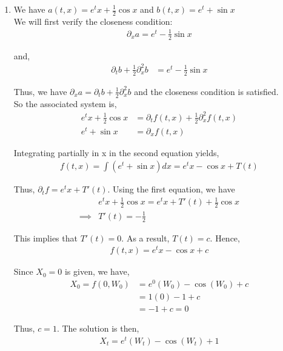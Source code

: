 \documentclass[12pt]{article}
\begin{document}
\begin{enumerate}[\alph*)]
\item We have $a(t,x) = e^tx + \frac{1}{2}\cos x$ and $b(t,x) = e^t + \sin x$\\

We will first verify the closeness condition:
\begin{align*}
\partial_x a = e^t - \frac{1}{2}\sin x
\end{align*}

and,
\begin{align*}
\partial_t b + \frac{1}{2} \partial_x^2 b &= e^t - \frac{1}{2}\sin x
\end{align*}

Thus, we have $\partial_x a = \partial_t b + \frac{1}{2} \partial_x^2 b$ and the closeness condition is satisfied.\\

So the associated system is,
\begin{align*}
e^tx + \frac{1}{2}\cos x &= \partial_t f(t,x) + \frac{1}{2} \partial_x^2 f(t,x)\\
e^t + \sin x &= \partial_x f(t,x)
\end{align*}

Integrating partially in x in the second equation yields,
\begin{align*}
f(t,x) = \int (e^t + \sin x) dx = e^tx - \cos x + T(t)
\end{align*}

Thus, $\partial_t f = e^tx + T'(t)$. Using the first equation, we have
\begin{align*}
&e^tx + \frac{1}{2}\cos x = e^tx + T'(t) + \frac{1}{2}\cos x\\
\implies &T'(t) = -\frac{1}{2}
\end{align*}

This implies that $T'(t) = 0$. As a result, $T(t) = c$. Hence,
\begin{align*}
f(t,x) = e^tx - \cos x + c
\end{align*}

Since $X_0 = 0$ is given, we have,
\begin{align*}
X_0 = f(0, W_0) &= e^0(W_0) - \cos(W_0) + c\\
&= 1(0) - 1 + c\\
&= -1 + c = 0
\end{align*}

Thus, $c = 1$. The solution is then,
\begin{align*}
X_t = e^t(W_t) - \cos(W_t) + 1
\end{align*} 


\end{enumerate}
\end{document}
